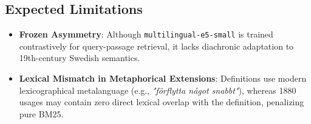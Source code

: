 \subsection{Expected Limitations}
\begin{itemize}
    \item \textbf{Frozen Asymmetry}: Although \texttt{multilingual-e5-small} is trained contrastively for query-passage retrieval, it lacks diachronic adaptation to 19th-century Swedish semantics.
    \item \textbf{Lexical Mismatch in Metaphorical Extensions}: Definitions use modern lexicographical metalanguage (e.g., \textit{"f\"orflytta n\aa{}got snabbt"}), whereas 1880 usages may contain zero direct lexical overlap with the definition, penalizing pure BM25.
\end{itemize}

